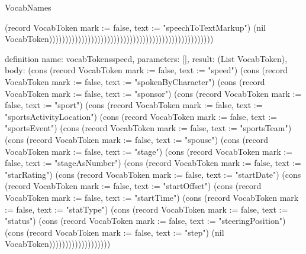\begin{lexlean}{VocabNames}
\begin{semanticmodule}
{(record VocabToken {mark := false, text := "speechToTextMarkup"}) (nil VocabToken)))))))))))))))))))))))))))))))))))))))))))))))))))
}

definition{
  name: vocabTokensspeed,
  parameters: [],
  result: (List VocabToken),
  body: (cons (record VocabToken {mark := false, text := "speed"}) (cons (record VocabToken {mark := false, text := "spokenByCharacter"}) (cons (record VocabToken {mark := false, text := "sponsor"}) (cons (record VocabToken {mark := false, text := "sport"}) (cons (record VocabToken {mark := false, text := "sportsActivityLocation"}) (cons (record VocabToken {mark := false, text := "sportsEvent"}) (cons (record VocabToken {mark := false, text := "sportsTeam"}) (cons (record VocabToken {mark := false, text := "spouse"}) (cons (record VocabToken {mark := false, text := "stage"}) (cons (record VocabToken {mark := false, text := "stageAsNumber"}) (cons (record VocabToken {mark := false, text := "starRating"}) (cons (record VocabToken {mark := false, text := "startDate"}) (cons (record VocabToken {mark := false, text := "startOffset"}) (cons (record VocabToken {mark := false, text := "startTime"}) (cons (record VocabToken {mark := false, text := "statType"}) (cons (record VocabToken {mark := false, text := "status"}) (cons (record VocabToken {mark := false, text := "steeringPosition"}) (cons (record VocabToken {mark := false, text := "step"}) (nil VocabToken)))))))))))))))))))
}


\end{semanticmodule}
\end{lexlean}
